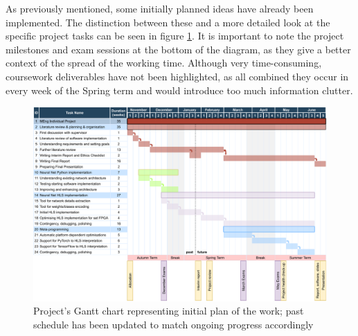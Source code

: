 As previously mentioned, some initially planned ideas have already been implemented. The distinction between these and a more detailed look at the specific project tasks can be seen in figure \ref{fig:gantt-chart}. It is important to note the project milestones and exam sessions at the bottom of the diagram, as they give a better context of the spread of the working time. Although very time-consuming, coursework deliverables have not been highlighted, as all combined they occur in every week of the Spring term and would introduce too much information clutter.

\begin{figure}[hpt]
  \centering
  \includegraphics[trim={0cm 0cm 0cm 0cm}, width=1.2\textwidth, center]{project/gantt_chart.pdf}
  \caption{Project's Gantt chart representing initial plan of the work; past schedule has been updated to match ongoing progress accordingly}
  \label{fig:gantt-chart}
\end{figure}
